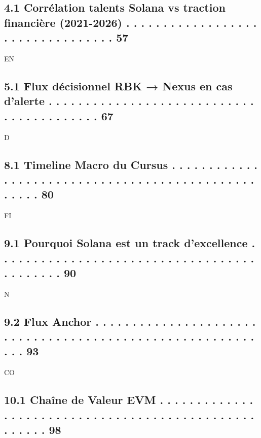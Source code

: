 \documentclass[12pt,landscape,a4paper]{article}
\begin{document}
\subsection{4.1 Corrélation talents Solana vs traction financière (2021-2026) . . . . . . . . . . . . . . . . . . . . . . . . . . . . . . . . .     57}
\vspace{0.5em}
\vspace{0.5em}
\vspace{0.5em}
\vspace{0.5em}
EN\\
\subsection{5.1 Flux décisionnel RBK → Nexus en cas d’alerte . . . . . . . . . . . . . . . . . . . . . . . . . . . . . . . . . . . . . . . . .      67}
\vspace{0.5em}
\vspace{0.5em}
\vspace{0.5em}
\vspace{0.5em}
D\\
\subsection{8.1 Timeline Macro du Cursus . . . . . . . . . . . . . . . . . . . . . . . . . . . . . . . . . . . . . . . . . . . . . . . . . . .      80}
\vspace{0.5em}
\vspace{0.5em}
\vspace{0.5em}
\vspace{0.5em}
FI\\
\subsection{9.1 Pourquoi Solana est un track d’excellence . . . . . . . . . . . . . . . . . . . . . . . . . . . . . . . . . . . . . . . . . . .     90}
\vspace{0.5em}
N\\
\subsection{9.2 Flux Anchor . . . . . . . . . . . . . . . . . . . . . . . . . . . . . . . . . . . . . . . . . . . . . . . . . . . . . . . . . . .   93}
CO\\
\subsection{10.1 Chaîne de Valeur EVM . . . . . . . . . . . . . . . . . . . . . . . . . . . . . . . . . . . . . . . . . . . . . . . . . . . . .     98}
\vspace{0.5em}
\end{document}
